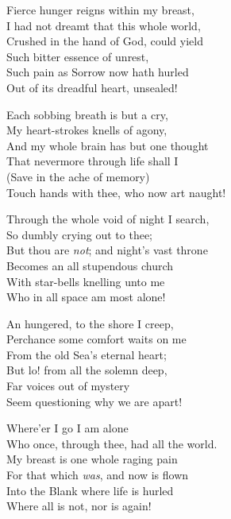 \vspace*{0.5\nbs} %
{\centering{}\par}
\vspace{0.5\nbs}
\begin{adjustwidth}{5.5em}{0em} %
\noindent Fierce hunger reigns within my breast,\\
I had not dreamt that this whole world,\\
Crushed in the hand of God, could yield\\
Such bitter essence of unrest,\\
Such pain as Sorrow now hath hurled\\
Out of its dreadful heart, unsealed!\par
\vspace{0.5\nbs} %
\noindent Each sobbing breath is but a cry,\\
My heart-strokes knells of agony,\\
And my whole brain has but one thought\\
That nevermore through life shall I\\
(Save in the ache of memory)\\
Touch hands with thee, who now art naught!\par
\vspace{0.5\nbs}
\noindent Through the whole void of night I search,\\
So dumbly crying out to thee;\\
But thou are \textit{not}; and night’s vast throne\\
Becomes an all stupendous church\\
With star-bells knelling unto me\\
Who in all space am most alone!\par
\vspace{0.5\nbs}
\noindent An hungered, to the shore I creep,\\
Perchance some comfort waits on me\\
From the old Sea’s eternal heart;\\
But lo! from all the solemn deep,\\
Far voices out of mystery\\
Seem questioning why we are apart!\par
\vspace{0.5\nbs}
\noindent Where’er I go I am alone\\
Who once, through thee, had all the world.\\
My breast is one whole raging pain\\
For that which \textit{was}, and now is flown\\
Into the Blank where life is hurled\\
Where all is not, nor is again!\par
\end{adjustwidth}

\clearpage
